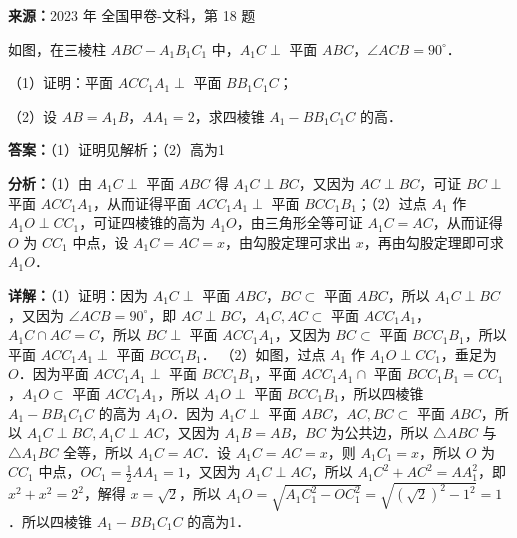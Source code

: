 \begin{question}
\textbf{来源：}2023 年 全国甲卷-文科，第 18 题\par
如图，在三棱柱 $ABC-A_1B_1C_1$ 中，$A_1C\perp$ 平面 $ABC$，$\angle ACB=90^\circ$．

（1）证明：平面 $ACC_1A_1\perp$ 平面 $BB_1C_1C$；

（2）设 $AB=A_1B$，$AA_1=2$，求四棱锥 $A_1-BB_1C_1C$ 的高．
\begin{solution}
\textbf{答案：}（1）证明见解析；（2）高为1

\textbf{分析：}（1）由 $A_1C\perp$ 平面 $ABC$ 得 $A_1C\perp BC$，又因为 $AC\perp BC$，可证 $BC\perp$ 平面 $ACC_1A_1$，从而证得平面 $ACC_1A_1\perp$ 平面 $BCC_1B_1$；（2）过点 $A_1$ 作 $A_1O\perp CC_1$，可证四棱锥的高为 $A_1O$，由三角形全等可证 $A_1C=AC$，从而证得 $O$ 为 $CC_1$ 中点，设 $A_1C=AC=x$，由勾股定理可求出 $x$，再由勾股定理即可求 $A_1O$．

\textbf{详解：}（1）证明：因为 $A_1C\perp$ 平面 $ABC$，$BC\subset$ 平面 $ABC$，所以 $A_1C\perp BC$，又因为 $\angle ACB=90^\circ$，即 $AC\perp BC$，$A_1C, AC\subset$ 平面 $ACC_1A_1$，$A_1C\cap AC=C$，所以 $BC\perp$ 平面 $ACC_1A_1$，又因为 $BC\subset$ 平面 $BCC_1B_1$，所以平面 $ACC_1A_1\perp$ 平面 $BCC_1B_1$．
（2）如图，过点 $A_1$ 作 $A_1O\perp CC_1$，垂足为 $O$．因为平面 $ACC_1A_1\perp$ 平面 $BCC_1B_1$，平面 $ACC_1A_1\cap$ 平面 $BCC_1B_1=CC_1$，$A_1O\subset$ 平面 $ACC_1A_1$，所以 $A_1O\perp$ 平面 $BCC_1B_1$，所以四棱锥 $A_1-BB_1C_1C$ 的高为 $A_1O$．因为 $A_1C\perp$ 平面 $ABC$，$AC, BC\subset$ 平面 $ABC$，所以 $A_1C\perp BC, A_1C\perp AC$，又因为 $A_1B=AB$，$BC$ 为公共边，所以 $\triangle ABC$ 与 $\triangle A_1BC$ 全等，所以 $A_1C=AC$．设 $A_1C=AC=x$，则 $A_1C_1=x$，所以 $O$ 为 $CC_1$ 中点，$OC_1=\frac{1}{2}AA_1=1$，又因为 $A_1C\perp AC$，所以 $A_1C^2+AC^2=AA_1^2$，即 $x^2+x^2=2^2$，解得 $x=\sqrt{2}$，所以 $A_1O=\sqrt{A_1C_1^2-OC_1^2}=\sqrt{(\sqrt{2})^2-1^2}=1$．所以四棱锥 $A_1-BB_1C_1C$ 的高为1．
\end{solution}
\end{question}

